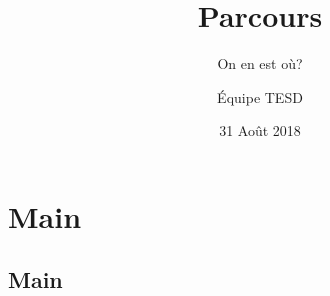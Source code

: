 \documentclass[french]{beamer}
\title[Parcours, Août 2018]{Parcours} %
\subtitle{On en est où?}
\author{Équipe TESD} %
\institute[CRIM] %
{
CRIM \\ %
\medskip
\textit{prenom.nom@crim.ca} %
}
\date{31 Août 2018} %
\begin{document}
\begin{frame}
\titlepage %
\end{frame}



\section{Main} %

\subsection{Main} %
\end{document}
